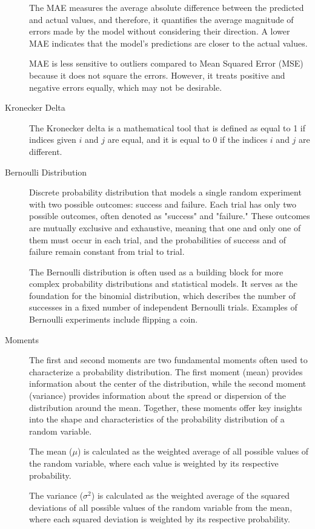\documentclass[a4paper]{report}
\begin{document}
\begin{description}
The MAE measures the average absolute difference between the predicted and actual values, and therefore, it quantifies the average magnitude of errors made by the model without considering their direction. A lower MAE indicates that the model's predictions are closer to the actual values.

MAE is less sensitive to outliers compared to Mean Squared Error (MSE) because it does not square the errors. However, it treats positive and negative errors equally, which may not be desirable.

\item[Kronecker Delta]
The Kronecker delta is a mathematical tool that is defined as equal to 1 if indices given $i$ and $j$ are equal, and it is equal to 0 if the indices $i$ and $j$ are different.

\item[Bernoulli Distribution]
Discrete probability distribution that models a single random experiment with two possible outcomes: success and failure. Each trial has only two possible outcomes, often denoted as "success" and "failure." These outcomes are mutually exclusive and exhaustive, meaning that one and only one of them must occur in each trial, and the probabilities of success and of failure remain constant from trial to trial. 

The Bernoulli distribution is often used as a building block for more complex probability distributions and statistical models. It serves as the foundation for the binomial distribution, which describes the number of successes in a fixed number of independent Bernoulli trials. Examples of Bernoulli experiments include flipping a coin.

\item[Moments]
The first and second moments are two fundamental moments often used to characterize a probability distribution. The first moment (mean) provides information about the center of the distribution, while the second moment (variance) provides information about the spread or dispersion of the distribution around the mean. Together, these moments offer key insights into the shape and characteristics of the probability distribution of a random variable.

The mean ($\mu$) is calculated as the weighted average of all possible values of the random variable, where each value is weighted by its respective probability. 

The variance ($\sigma^2$) is calculated as the weighted average of the squared deviations of all possible values of the random variable from the mean, where each squared deviation is weighted by its respective probability. 


\end{description}
\end{document}
